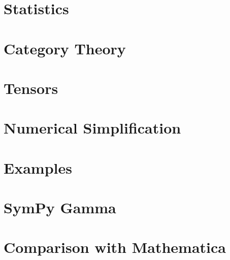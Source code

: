 \documentclass[fleqn,10pt,lineno,numbers]{wlpeerj} %
\begin{document}
\section{Statistics}
\label{suppsec:Stats}


\section{Category Theory}
\label{suppsec:Cat}


\section{Tensors}
\label{suppsec:Ten}


\section{Numerical Simplification}
\label{suppsec:numsimpl}


\section{Examples}
\label{suppsec:examples}


\section{SymPy Gamma}
\label{suppsec:sympy-gamma}


\section{Comparison with Mathematica}
\label{suppsec:comp-mma}



\end{document}
